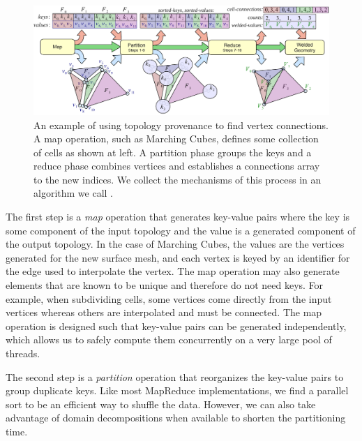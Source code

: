 \documentclass[10pt,journal,cspaper,compsoc]{IEEEtran}
\begin{document}
\begin{figure}[!tb]
\includegraphics[width=\textwidth]{KeyWeld.pdf}
\caption{An example of using topology provenance to find vertex
  connections.  A map operation, such as Marching Cubes, defines some
  collection of cells as shown at left.  A partition phase groups the keys
  and a reduce phase combines vertices and establishes a connections array
  to the new indices.  We collect the mechanisms of this process in an
  algorithm we call .
}
\label{fig:KeyWeld}
\end{figure}

The first step is a \emph{map} operation that generates key-value pairs
where the key is some component of the input topology and the value is a
generated component of the output topology.  In the case of Marching Cubes,
the values are the vertices generated for the new surface mesh, and each
vertex is keyed by an identifier for the edge used to interpolate the
vertex.  The map operation may also generate elements that are known to be
unique and therefore do not need keys.  For example, when subdividing
cells, some vertices come directly from the input vertices whereas others
are interpolated and must be connected.  The map operation is designed such that
key-value pairs can be generated independently, which allows us to safely
compute them concurrently on a very large pool of threads.

The second step is a \emph{partition} operation that reorganizes the
key-value pairs to group duplicate keys.  Like most MapReduce
implementations, we find a parallel sort to be an efficient way to shuffle
the data.  However, we can also take advantage of domain decompositions
when available to shorten the partitioning time.
\end{document}
